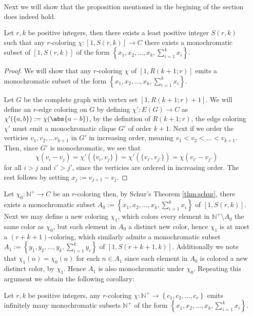 Next we will show that the proposition mentioned in the begining of the section does indeed hold.
\begin{theorem}\label{thm:schur}
	Let $r, k$ be positive integers, then there exists a least positive integer $S(r, k)$ such that any $r$-coloring $\chi: [1, S(r, k)] \to C$ there exists a monochromatic subset of $[1, S(r, k)]$ of the form $\left\{x_1, x_2, \ldots, x_{k}, \sum_{i = 1}^k x_i\right\}$.
\end{theorem}
\begin{proof}
	We will show that any $r$-coloring $\chi$ of $[1, R(k + 1; r)]$ emits a monochromatic subset of the form $\left\{x_1, x_2, \ldots, x_{k}, \sum_{i = 1}^k x_i\right\}$.

	Let $G$ be the complete graph with vertex set $[1, R(k + 1; r) + 1]$. We will define an $r$-edge coloring on $G$ by defining $\chi': E(G) \to C$ as $\chi'(\left\{a, b\right\}) := \chi(\abs{a - b})$, by the definition of $R(k + 1; r)$, the edge coloring $\chi'$ must emit a monochromatic clique $G'$ of order $k + 1$. Next if we order the verticies $v_1, v_2, \ldots v_{k + 1}$ in $G'$ in increasing order, meaning $v_1 < v_2 < \ldots < v_{k + 1}$.
	Then, since $G'$ is monochromatic, we see that
	\begin{equation*}
		\chi(v_i - v_j) = \chi'(\{v_i, v_j\}) = \chi'(\{v_{i'}, v_{j'} \}) = \chi(v_{i'} - v_{j'})
	\end{equation*}
	for all $i > j$ and $i' > j'$, since the verticies are ordered in increasing order. The rest follows by setting $x_j := v_{j + 1} - v_{j}$.
\end{proof}
Let $\chi_{0}: \mathbb{N}^+ \to C$ be an $r$-coloring then, by Schur's Theorem \ref{thm:schur}, there exists a monochromatic subset $A_0 := \left\{x_1, x_2, \ldots, x_{k}, \sum_{i = 1}^k x_i\right\}$ of $[1, S(r, k)]$. Next we may define a new coloring $\chi_1$, which colors every element in $\mathbb{N}^+ \setminus A_{0}$ the same color as $\chi_{0}$, but each element in $A_{0}$ a distinct new color, hence $\chi_1$ is at most a $(r + k + 1)$-coloring, which similarly admits a monochromatic subset $A_1 := \left\{y_1, y_2, \ldots, y_{k}, \sum_{i = 1}^k y_{i}\right\}$ of $[1, S(r + k + 1, k)]$. Additionally we note that $\chi_1(n) = \chi_0(n)$ for each $n \in A_1$ since each element in $A_0$ is colored a new distinct color, by $\chi_{1}$. Hence $A_1$ is also monochromatic under $\chi_0$. Repeating this argument we obtain the following corollary:
\begin{corollary}
	Let $r, k$ be positive integers, any $r$-coloring $\chi: \mathbb{N}^{+} \to \left\{c_1, c_2, \ldots, c_{r}\right\}$ emits infinitely many monochromatic subsets $\mathbb{N}^{+}$ of the form $\left\{x_1, x_2, \ldots, x_{k}, \sum_{i = 1}^k x_i\right\}$.
\end{corollary}


